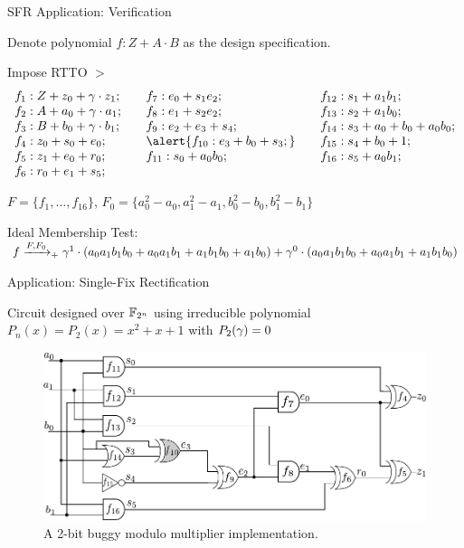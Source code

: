 \begin{frame}{\large SFR Application: Verification}
\bi
	\item Denote polynomial $f: Z + A\cdot B$ as the design specification.
	\item Impose RTTO $>$
\ei
\[ \begin{array}{lll}%
f_1:Z + z_0 +\ga \cdot z_1;&\quad  f_7:e_0 + s_1e_2; 	   &\quad f_{12}:s_1 + a_1b_1; \\
f_2:A + a_0 +\ga \cdot a_1;&\quad  f_8:e_1 + s_2e_2; 	   &\quad f_{13}:s_2 + a_1b_0;  \\
f_3:B + b_0 +\ga \cdot b_1;&\quad  f_9:e_2 + e_3 + s_4;    &\quad f_{14}:s_3 + a_0 + b_0 + a_0b_0; \\ 
f_4:z_0 + s_0 + e_0;  	   &\quad  \alert{f_{10}:e_3 + b_0 + s_3;} &\quad f_{15}:s_4 + b_0 + 1;\\ 
f_5:z_1 + e_0 + r_0;  	   &\quad  f_{11}:s_0 + a_0b_0;    &\quad f_{16}:s_5 + a_0b_1;  \\
f_6:r_0 + e_1 + s_5;            						    
\end{array}\]%

\bi
	\item $F = \{f_1,\dots,f_{16}\}$, $F_0 = \{a_0^2-a_0, a_1^2-a_1,
b_0^2-b_0, b_1^2-b_1\}$
	\item Ideal Membership Test: $f\xrightarrow{F,F_0}_+\gamma^1\cdot (a_0a_1b_1b_0+a_0a_1b_1+a_1b_1b_0+a_1b_0) + \gamma^0\cdot (a_0a_1b_1b_0+a_0a_1b_1+a_1b_1b_0)$
\ei
\end{frame}

\begin{frame}{\large Application: Single-Fix Rectification}
\bi
	\item Circuit designed over ${\mathbb{F}}_{2^n}$ using irreducible polynomial $P_n(x) = P_2(x) = x^2+x+1$ with $P_2(\gamma)=0$
\ei
\begin{figure}[hbt]
    \begin{center}
    \includegraphics[scale = 0.64]{mas_red_bug-eps-converted-to.pdf}
    \end{center}
    \caption*{\small A 2-bit buggy modulo
      multiplier implementation. 
    }
    \label{fig:mas_both}
\end{figure}

\end{frame}

